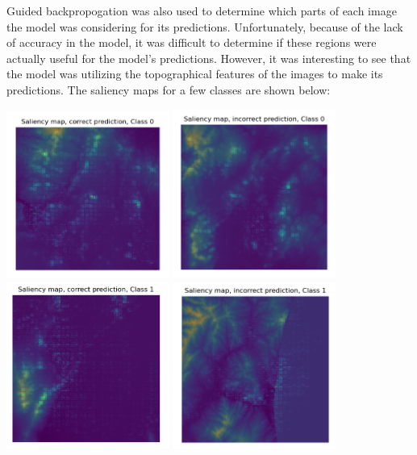 \documentclass{article}[12pt]
\begin{document}
\indent
Guided backpropogation was also used to determine which parts of each image the model was considering for its predictions. Unfortunately, because of the lack of accuracy in the model, it was difficult to determine if these regions were actually useful for the model's predictions. However, it was interesting to see that the model was utilizing the topographical features of the images to make its predictions. The saliency maps for a few classes are shown below:\\

\begin{center}
    \includegraphics[width=0.4\textwidth]{images/correct_0.png}
    \includegraphics[width=0.4\textwidth]{images/incorrect_0.png}\\
    \includegraphics[width=0.4\textwidth]{images/correct_1.png}
    \includegraphics[width=0.4\textwidth]{images/incorrect_1.png}\\

\end{center}
\end{document}
